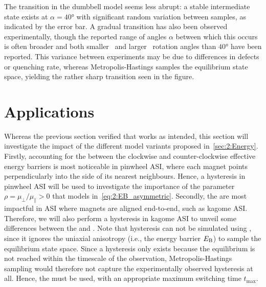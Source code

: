 
The transition in the dumbbell model seems less abrupt: a stable intermediate state exists at $\alpha=\ang{40}$ with significant random variation between samples, as indicated by the error bar. %
A gradual transition has also been observed experimentally, though the reported range of angles $\alpha$ between which this occurs is often broader and both smaller~\cite{ProbingAFM-PMtransition} and larger~\cite{AFM-FM-transition-Pinwheel} rotation angles than $\ang{40}$ have been reported.
This variance between experiments may be due to differences in defects or quenching rate, whereas Metropolis-Hastings samples the equilibrium state space, yielding the rather sharp transition seen in the figure.

\newpage
\section{Applications}
Whereas the previous section verified that \hotspice works as intended, this section will investigate the impact of the different model variants proposed in~\cref{sec:2:Energy}.
Firstly, accounting for the  between the clockwise and counter-clockwise effective energy barriers is most noticeable in pinwheel ASI, where each magnet points perpendicularly into the side of its nearest neighbours.
Hence, a hysteresis in pinwheel ASI will be used to investigate the importance of the parameter $\rho = \mu_\perp/\mu_\parallel > 0$ that models  in~\cref{eq:2:EB_asymmetric}.
Secondly, the  are most impactful in ASI where magnets are aligned end-to-end, such as kagome ASI.
Therefore, we will also perform a hysteresis in kagome ASI to unveil some differences between the  and .
Note that hysteresis can not be simulated using , since it ignores the uniaxial anisotropy (i.e., the energy barrier $E_\mathrm{B}$) to sample the equilibrium state space.
Since a hysteresis only exists because the equilibrium is not reached within the timescale of the observation, Metropolis-Hastings sampling would therefore not capture the experimentally observed hysteresis at all.
Hence, the  must be used, with an appropriate maximum switching time $t_\mathrm{max}$. 

